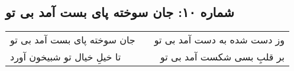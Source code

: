 \begin{center}
\section*{شماره ۱۰: جان سوخته پای بست آمد بی تو}
\label{sec:010}
\begin{longtable}{l p{0.5cm} r}
جان سوخته پای بست آمد بی تو
&&
وز دست شده به دست آمد بی تو
\\
تا خیلِ خیال تو شبیخون آورد
&&
بر قلبِ بسی شکست آمد بی تو
\\
\end{longtable}
\end{center}

